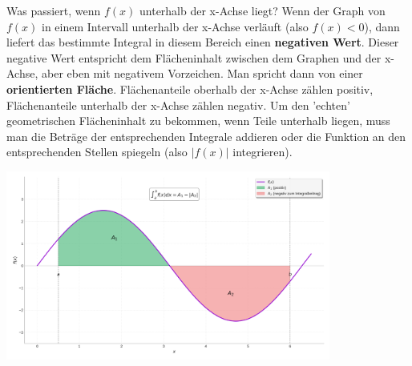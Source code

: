 \begin{infoboxumgebung}{Was passiert, wenn $f(x)$ unterhalb der x-Achse liegt?}
Wenn der Graph von $f(x)$ in einem Intervall unterhalb der x-Achse verläuft (also $f(x) < 0$), dann liefert das bestimmte Integral in diesem Bereich einen \textbf{negativen Wert}. Dieser negative Wert entspricht dem Flächeninhalt zwischen dem Graphen und der x-Achse, aber eben mit negativem Vorzeichen.
Man spricht dann von einer \textbf{orientierten Fläche}. Flächenanteile oberhalb der x-Achse zählen positiv, Flächenanteile unterhalb der x-Achse zählen negativ.
Um den 'echten' geometrischen Flächeninhalt zu bekommen, wenn Teile unterhalb liegen, muss man die Beträge der entsprechenden Integrale addieren oder die Funktion an den entsprechenden Stellen spiegeln (also $|f(x)|$ integrieren).
\begin{center}
    \includegraphics[width=0.8\textwidth]{grafiken/Integral_Orientierte_Flaeche.png}
    \label{fig:orientierte_flaeche}
\end{center}
\end{infoboxumgebung}


